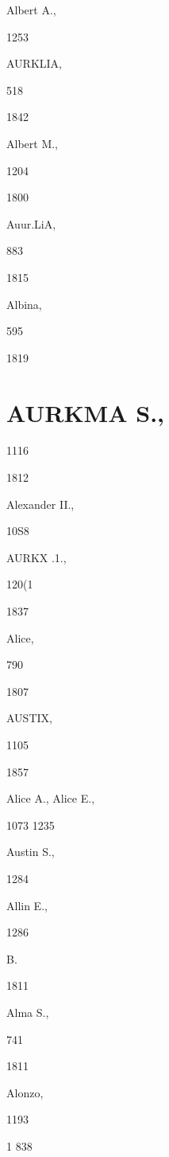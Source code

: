 \documentclass{book}
\begin{document}
Albert A., 


1253 




AURKLIA, 


518 


1842 


Albert M., 


1204 


1800 


Auur.LiA, 


883 


1815 


Albina, 


595 


1819 


\chapter{AURKMA S.,}

1116 


1812 


Alexander II., 


10S8 




AURKX .1., 


120(1 


1837 


Alice, 


790 


1807 


AUSTIX, 


1105 


1857 


Alice A., 
Alice E., 


1073 
1235 




Austin S., 


1284 




Allin E., 


1286 




B. 




1811 


Alma S., 


741 








1811 


Alonzo, 


1193 


1 838 
\end{document}
